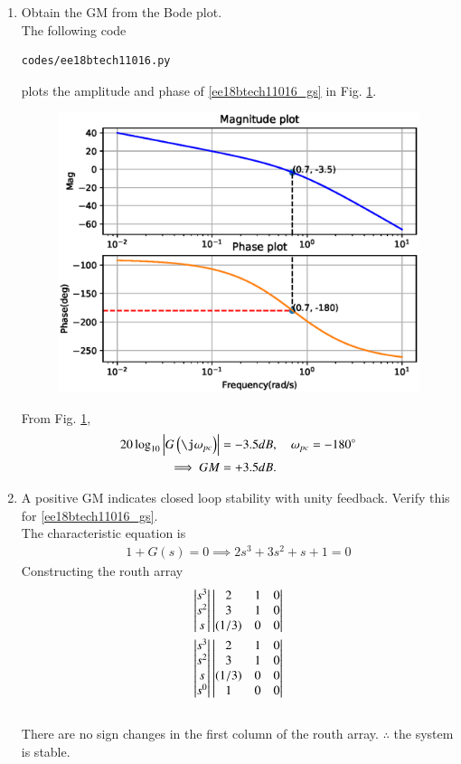 \begin{enumerate}[label=\thesubsection.\arabic*.,ref=\thesubsection.\theenumi]
\item Obtain the GM from the Bode plot.
\\
\solution The following code 
\begin{lstlisting}
codes/ee18btech11016.py
\end{lstlisting}
%
plots the amplitude and phase of \eqref{ee18btech11016_gs} in Fig. \ref{fig:ee18btech11016}.
%
\begin{figure}[htp]
	\centering
	\includegraphics[width=\columnwidth]{./figs/ee18btech11016/ee18btech11016.eps}
	\caption{}
	\label{fig:ee18btech11016}
\end{figure}
From Fig. \ref{fig:ee18btech11016},
\begin{align}
20\log_{10}\abs{G\brak{\j\omega_{pc}}} &= -3.5dB,  \quad \omega_{pc} = -180\degree
\\
\implies  GM &= +3.5dB. 
\end{align}
\item A positive GM indicates closed loop stability with unity feedback.  Verify this for \eqref{ee18btech11016_gs}.
\\
\solution 
The characteristic equation is 
\begin{align}
1+G(s)=0 
\implies 2s^3 + 3s^2 + s + 1 = 0 
\end{align}
Constructing the routh array
\begin{align}
\begin{vmatrix}s^3\\s^2\\s\end{vmatrix}
\begin{vmatrix}2 & 1 & 0 \\ 3 & 1 & 0 \\ (1/3) & 0 & 0\end{vmatrix}
\\
\begin{vmatrix}s^3\\s^2\\s\\s^0\end{vmatrix}
\begin{vmatrix}2 & 1 & 0 \\ 3 & 1 & 0 \\ (1/3) & 0 & 0 \\ 1 & 0 & 0\end{vmatrix}
\end{align}\\
%
There are no sign changes in the first column of the routh array. 
$\therefore$ the system is stable.


\end{enumerate}
